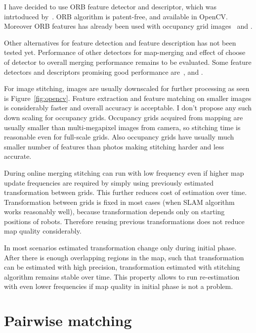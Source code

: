 I have decided to use \gls{ORB} feature detector and descriptor, which was intrtoduced by~\cite{Rublee2011}. \gls{ORB} algorithm is patent-free, and available in \gls{OpenCV}. Moreover \gls{ORB} features has already been used with occupancy grid images~\cite{MapstitchROS} and \cite{Andre2014}.

Other alternatives for feature detection and feature description has not been tested yet. Performance of other detectors for map-merging and effect of choose of detector to overall merging performance remains to be evaluated. Some feature detectors and descriptors promising good performance are~\cite{Alahi2012}, \cite{alcantarilla2011fast} and \cite{calonder2010brief}.

For image stitching, images are usually downscaled for further processing as seen is Figure~\ref{fig:opencv}. Feature extraction and feature matching on smaller images is considerably faster and overall accuracy is acceptable. I don't propose any such down scaling for occupancy grids. Occupancy grids acquired from mapping are usually smaller than multi-megapixel images from camera, so stitching time is reasonable even for full-scale grids. Also occupancy grids have usually much smaller number of features than photos making stitching harder and less accurate.

During online merging stitching can run with low frequency even if higher map update frequencies are required by simply using previously estimated transformation between grids. This further reduces cost of estimation over time. Transformation between grids is fixed in most cases (when \gls{SLAM} algorithm works reasonably well), because transformation depends only on starting positions of robots. Therefore reusing previous transformations does not reduce map quality considerably.

In most scenarios estimated transformation change only during initial phase. After there is enough overlapping regions in the map, such that transformation can be estimated with high precision, transformation estimated with stitching algorithm remains stable over time. This property allows to run re-estimation with even lower frequencies if map quality in initial phase is not a problem.


\section{Pairwise matching} %
\label{sec:pairwisematching}


